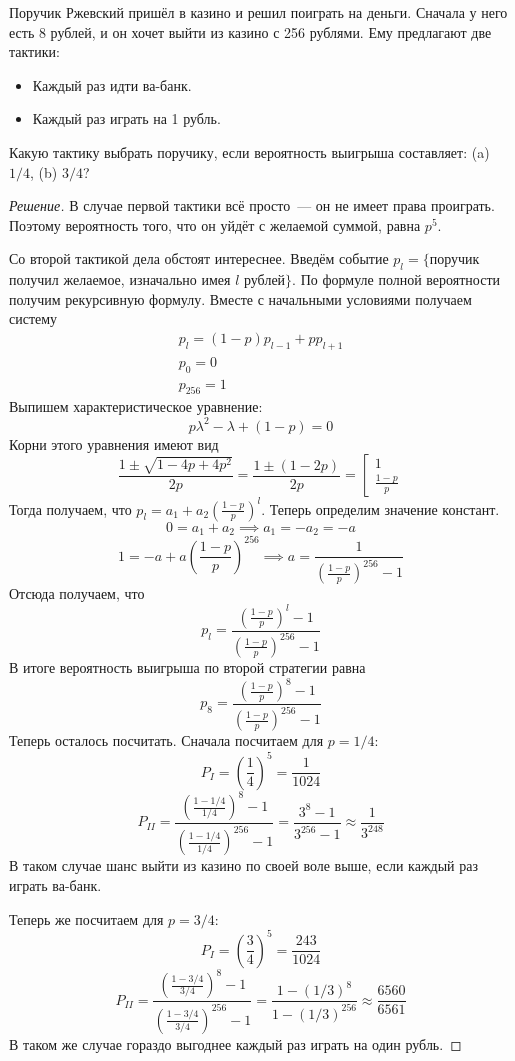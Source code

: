 \documentclass[a4paper,12pt]{article}
\begin{document}
\begin{problem}
	Поручик Ржевский пришёл в казино и решил поиграть на деньги. Сначала у него есть 8 рублей, и он хочет выйти из казино с 256 рублями. Ему предлагают две тактики:
	\begin{itemize}
		\item Каждый раз идти ва-банк.
		\item Каждый раз играть на 1 рубль.
	\end{itemize}
	Какую тактику выбрать поручику, если вероятность выигрыша составляет: (a) \(1/4\), (b) \(3/4\)?
\end{problem}
\begin{proof}[Решение]
	В случае первой тактики всё просто~--- он не имеет права проиграть. Поэтому вероятность того, что он уйдёт с желаемой суммой, равна \(p^5\).
	
	Со второй тактикой дела обстоят интереснее. Введём событие \(p_{l} = \{\)поручик получил желаемое, изначально имея \(l\) рублей\(\}\). По формуле полной вероятности получим рекурсивную формулу. Вместе с начальными условиями получаем систему
	\[\begin{array}{l}
	p_{l} = (1 - p)p_{l - 1} + pp_{l + 1} \\
	p_{0} = 0 \\
	p_{256} = 1
	\end{array}\]
	Выпишем характеристическое уравнение:
	\[p\lambda^2 - \lambda + (1 - p) = 0\]
	Корни этого уравнения имеют вид \[\frac{1 \pm \sqrt{1 - 4p + 4p^2}}{2p} = \frac{1 \pm (1 - 2p)}{2p} = \left[\begin{array}{l}
	1 \\ \frac{1 - p}{p}
	\end{array}\right.\]
	Тогда получаем, что \(p_{l} = a_1 + a_2\left(\frac{1 - p}{p}\right)^{l}\). Теперь определим значение констант.
	\[0 = a_1 + a_2 \implies a_1 = -a_2 = -a\]
	\[1 = -a + a\left(\frac{1 - p}{p}\right)^{256} \implies a = \frac{1}{\left(\frac{1 - p}{p}\right)^{256} - 1}\]
	Отсюда получаем, что \[p_{l} = \frac{\left(\frac{1 - p}{p}\right)^{l} - 1}{\left(\frac{1 - p}{p}\right)^{256} - 1}\]
	В итоге вероятность выигрыша по второй стратегии равна
	\[p_8 = \frac{\left(\frac{1 - p}{p}\right)^{8} - 1}{\left(\frac{1 - p}{p}\right)^{256} - 1}\]
	Теперь осталось посчитать. Сначала посчитаем для \(p = 1/4\):
	\[P_I = \left(\frac{1}{4}\right)^5 = \frac{1}{1024}\]
	\[P_{II} = \frac{\left(\frac{1 - 1/4}{1/4}\right)^{8} - 1}{\left(\frac{1 - 1/4}{1/4}\right)^{256} - 1} = \frac{3^8 - 1}{3^{256} - 1} \approx \frac{1}{3^{248}}\]
	В таком случае шанс выйти из казино по своей воле выше, если каждый раз играть ва-банк.
	
	Теперь же посчитаем для \(p = 3/4\):
	\[P_{I} = \left(\frac{3}{4}\right)^5 = \frac{243}{1024}\]
	\[P_{II} = \frac{\left(\frac{1 - 3/4}{3/4}\right)^{8} - 1}{\left(\frac{1 - 3/4}{3/4}\right)^{256} - 1} = \frac{1 - (1/3)^{8}}{1 - (1/3)^{256}} \approx \frac{6560}{6561}\]
	В таком же случае гораздо выгоднее каждый раз играть на один рубль.
\end{proof}
\end{document}
